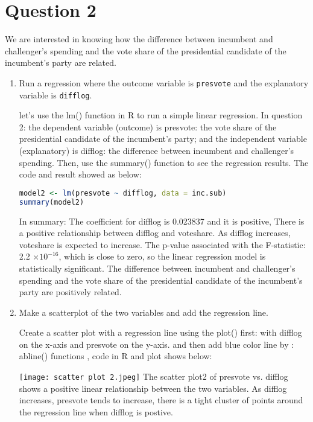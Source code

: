 \documentclass[12pt,letterpaper]{article}
\begin{document}
\section*{Question 2}
\noindent We are interested in knowing how the difference between incumbent and challenger's spending and the vote share of the presidential candidate of the incumbent's party are related.	\vspace{.25cm}
	\begin{enumerate}
		\item Run a regression where the outcome variable is \texttt{presvote} and the explanatory variable is \texttt{difflog}.	
  
  \noindent let's use the lm() function in R  to run a simple linear regression. In question 2: the dependent variable (outcome) is presvote: the vote share of the presidential candidate of the incumbent’s party; and the independent variable (explanatory) is difflog: the difference between incumbent and challenger’s spending.  Then, use the summary() function to see the regression results. The code  and result showed as below:  

  \begin{lstlisting}[language=R] 
model2 <- lm(presvote ~ difflog, data = inc.sub)
summary(model2)
 \end{lstlisting} 


\noindent In summary: The coefficient for difflog is 0.023837 and it is positive, There is a positive relationship between difflog and voteshare. As difflog increases, voteshare is expected to increase. The p-value associated with the F-statistic: 2.2 $\times 10^{-16}$,  
which is close to zero, so the linear regression model is statistically significant. The difference between incumbent and challenger’s spending and the vote share of the presidential candidate of the incumbent’s party are positively related. 
\newpage
		\item Make a scatterplot of the two variables and add the regression line. 	\vspace{2cm}

  Create a scatter plot with a regression line using the plot() first:  with difflog on the x-axis and presvote on the y-axis.  and  then add  blue color line by : abline() functions , code in R and plot shows below:

 \texttt{[image: scatter plot 2.jpeg]} 
The scatter plot2  of presvote vs. difflog shows a positive linear relationship between the two variables. As difflog increases, presvote tends to increase, there is a tight cluster of points around the regression line when difflog is postive. 


\end{enumerate}
\end{document}
